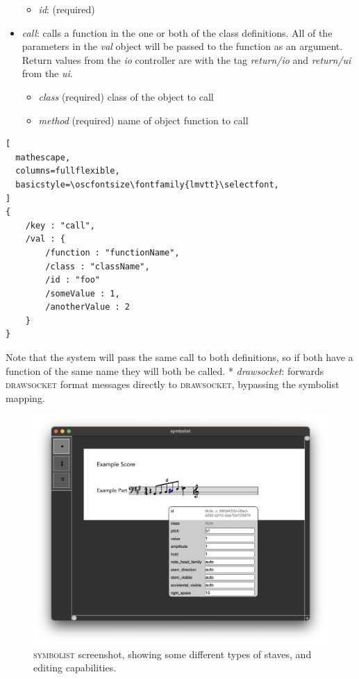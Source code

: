 \documentclass{article}
\def\symbolist{\textsc{symbolist}\xspace}
\def\drawsocket{\textsc{drawsocket}\xspace}
\def\oscfontsize{\footnotesize}
\begin{document}
\begin{itemize}
\begin{itemize}\itemsep0pt 
  \item \textit{id}: (required)
\end{itemize}
\item \textit{call}: calls a function in the one or both of the class definitions. All of the parameters in the \textit{val} object will be passed to the function as an argument. Return values from the \textit{io} controller are with the tag \textit{return/io} and \textit{return/ui} from the \textit{ui}.
\begin{itemize}\itemsep0pt 
  \item \textit{class} (required) class of the object to call
  \item \textit{method} (required) name of object function to call
\end{itemize}

\end{itemize}

\begin{lstlisting}[
  mathescape,
  columns=fullflexible,
  basicstyle=\oscfontsize\fontfamily{lmvtt}\selectfont,
]
{
    /key : "call",
    /val : {
        /function : "functionName",
        /class : "className",
        /id : "foo"
        /someValue : 1,
        /anotherValue : 2
    }
}
\end{lstlisting}

Note that the system will pass the same call to both definitions, so if both have a function of the same name they will both be called.
* \textit{drawsocket}: forwards \drawsocket format messages directly to \drawsocket, bypassing the symbolist mapping.


\begin{figure}[ht!]
\centering
\includegraphics[width=1.5\columnwidth]{nodescore.png}
\caption{ \symbolist screenshot, showing some different types of staves, and editing capabilities.
\label{fig:nodescore}}
\end{figure}
\end{document}
